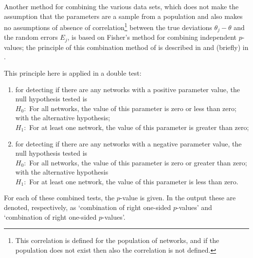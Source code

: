 \documentclass[a4paper,fleqn,11pt]{article}
\newcommand{\+}{\, + \,}
\begin{document}
Another method for combining the various data sets,
which does not make the assumption
that the parameters are a sample from a population and also
makes no assumptions of absence of correlation\footnote{This correlation
is defined for the population of networks, and if the population
does not exist then also the correlation is not defined.}
between the true deviations $\theta_j - \theta$
and the random errors $E_j$,
is based on Fisher's method for combining independent $p$-values;
the principle of this combination method of \citet{Fisher32} is described in
\citet{HedgesOlkin85}    and (briefly) in \citet[Chapter 3]{SnijdersBosker12}.

This principle here is applied in a double test:
\begin{enumerate}
\item for detecting if there are any networks with a positive parameter value,
         the null hypothesis tested is\\
       $H_0 :$   For all networks, the value of this parameter
            is zero or less than zero;\\
            with the alternative hypothesis;\\
        $H_1 :$
             For at least one network, the value of this parameter
             is greater than zero;
\item for detecting if there are any networks with a negative parameter value,
         the null hypothesis tested is\\
            $H_0 :$ For all networks, the value of this parameter
                  is zero or greater than zero;\\
            with the alternative hypothesis\\
            $H_1 :$ For at least one network, the value of this parameter
                   is less than zero.
\end{enumerate}
      For each of these combined tests, the $p$-value is given.
      In the output these are denoted, respectively,
      as `combination of right one-sided $p$-values' and
      `combination of right one-sided $p$-values'.
\end{document}

